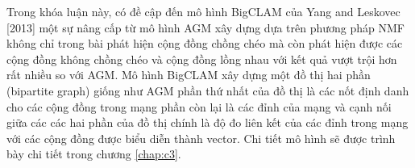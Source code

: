 Trong khóa luận này, có đề cập đến mô hình BigCLAM của Yang and Leskovec [2013] \cite{yang2013overlapping} một sự nâng cấp từ mô hình AGM xây dựng dựa trên phương pháp NMF không chỉ trong bài phát hiện cộng đồng chồng chéo mà còn phát hiện được các cộng đồng không chồng chéo và cộng đồng lồng nhau với kết quả vượt trội hơn rất nhiều so với AGM. Mô hình BigCLAM xây dựng một đồ thị hai phần (bipartite graph) giống như AGM phần thứ nhất của đồ thị là các nốt định danh cho các cộng đồng trong mạng phần còn lại là các đỉnh của mạng và cạnh nối giữa các các hai phần của đồ thị chính là độ đo liên kết của các đỉnh trong mạng với các cộng đồng được biểu diễn thành vector. Chi tiết mô hình sẽ được trình bày chi tiết trong chương \ref{chap:c3}.